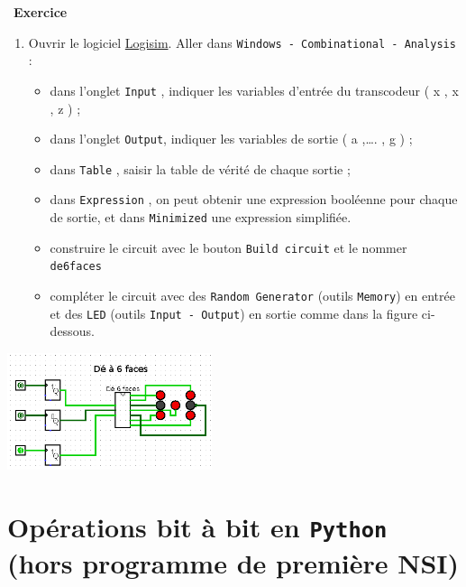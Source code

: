 \documentclass[
  11pt,
]{article}
\newcommand{\passthrough}[1]{#1}
\providecommand{\tightlist}{%
  \setlength{\itemsep}{0pt}\setlength{\parskip}{0pt}}
\newcounter{exo}
\newenvironment{exercice}[1]
{\par \medskip   \addtocounter{exo}{1} \noindent  
\begin{bclogo}[arrondi =0.1,   noborder = true, logo=\bccrayon, marge=4]{~\textbf{Exercice} \textbf{\theexo} {\itshape #1} }  \par}
{
\end{bclogo}
 \par \bigskip }
\newcounter{def}
\newcounter{prog}
\newcounter{logi}
\begin{document}
\begin{exercice}{}
\begin{enumerate}
\def\labelenumi{\arabic{enumi}.}
\setcounter{enumi}{1}
\tightlist
\item
  Ouvrir le logiciel \href{http://www.cburch.com/logisim/}{Logisim}.
  Aller dans
  \passthrough{\lstinline!Windows - Combinational - Analysis!} :

  \begin{itemize}
  \tightlist
  \item
    dans l'onglet \passthrough{\lstinline!Input!} , indiquer les
    variables d'entrée du transcodeur ( x , x , z ) ;
  \item
    dans l'onglet \passthrough{\lstinline!Output!}, indiquer les
    variables de sortie ( a ,\ldots. , g ) ;
  \item
    dans \passthrough{\lstinline!Table!} , saisir la table de vérité de
    chaque sortie ;
  \item
    dans \passthrough{\lstinline!Expression!} , on peut obtenir une
    expression booléenne pour chaque de sortie, et dans
    \passthrough{\lstinline!Minimized!} une expression simplifiée.
  \item
    construire le circuit avec le bouton
    \passthrough{\lstinline!Build circuit!} et le nommer
    \passthrough{\lstinline!de6faces!}
  \item
    compléter le circuit avec des
    \passthrough{\lstinline!Random Generator!} (outils
    \passthrough{\lstinline!Memory!}) en entrée et des
    \passthrough{\lstinline!LED!} (outils
    \passthrough{\lstinline!Input - Output!}) en sortie comme dans la
    figure ci-dessous.
  \end{itemize}
\end{enumerate}

\end{exercice}

\includegraphics[width=0.45\textwidth,height=\textheight]{images/de_6_faces.png}\\

\hypertarget{opuxe9rations-bit-uxe0-bit-en-python-hors-programme-de-premiuxe8re-nsi}{%
\section{\texorpdfstring{Opérations bit à bit en \texttt{Python} (hors
programme de première
NSI)}{Opérations bit à bit en Python (hors programme de première NSI)}}\label{opuxe9rations-bit-uxe0-bit-en-python-hors-programme-de-premiuxe8re-nsi}}
\end{document}
